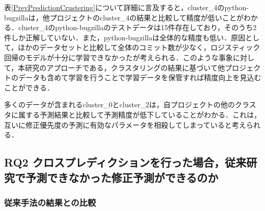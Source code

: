 \documentclass[T,J]{fose} %
\begin{document}
表\ref{PrevPredictionCrustering}について詳細に言及すると，cluster\_4のpython-bugzillaは，他プロジェクトのcluster\_4の結果と比較して精度が低いことがわかる．cluster\_4のpython-bugzillaのテストデータは15件存在しており，そのうち2件しか正解していない．また，python-bugzillaは全体的な精度も低い．原因として，ほかのデータセットと比較して全体のコミット数が少なく，ロジスティック回帰のモデルが十分に学習できなかったが考えられる．このような事象に対して，本研究のアプローチである，クラスタリングの結果に基づいて他プロジェクトのデータも含めて学習を行うことで学習データを保管すれば精度向上を見込むことができる．

多くのデータが含まれるcluster\_0とcluster\_2は，自プロジェクトの他のクラスタに属する予測結果と比較して予測精度が低下していることがわかる．これは，互いに修正優先度の予測に有効なパラメータを相殺してしまっていると考えられる．

\subsection{RQ2 クロスプレディクションを行った場合，従来研究で予測できなかった修正予測ができるのか}
\subsubsection{従来手法の結果との比較}
\end{document}
